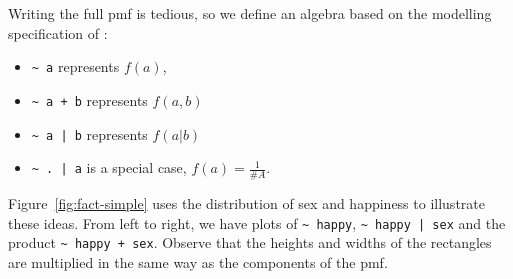 \documentclass[journal]{vgtc}
\begin{document}
Writing the full pmf is tedious, so we define an algebra based on the modelling specification of \citet{wilkinson:1973}:

\begin{itemize}
  \item \verb|~ a| represents $f(a)$,
  \item \verb|~ a + b| represents $f(a, b)$
  \item \verb!~ a | b! represents $f(a | b)$
  \item \verb!~ . | a! is a special case, $f(a) = \frac{1}{\#A}$.
\end{itemize}

Figure~\ref{fig:fact-simple} uses the distribution of sex and happiness to illustrate these ideas. From left to right, we have plots of \verb|~ happy|, \verb!~ happy | sex! and the product \verb|~ happy + sex|. Observe that the heights and widths of the rectangles are multiplied in the same way as the components of the pmf.
\end{document}
